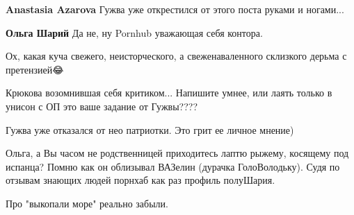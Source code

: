 \begin{itemize}
\begin{itemize}
\textbf{Anastasia Azarova} Гужва уже открестился от этого поста руками и ногами...

 
\textbf{Ольга Шарий} Да не, ну Pornhub уважающая себя контора.

 
Ох, какая куча свежего, неисторческого, а свеженаваленного склизкого дерьма с претензией😂

 
Крюкова возомнившая себя критиком... Напишите умнее, или лаять только в унисон с ОП это ваше задание от Гужвы????

 
Гужва уже отказался от нео патриотки.
Это грит ее личное мнение)

 
Ольга, а Вы часом не родственницей приходитесь лаптю рыжему, косящему под
испанца? Помню как он облизывал ВАЗелин (дурачка ГолоВолодьку). Судя по отзывам
знающих людей порнхаб как раз профиль полуШария.

 
Про "выкопали море" реально забыли.

 


\end{itemize}
\end{itemize}
